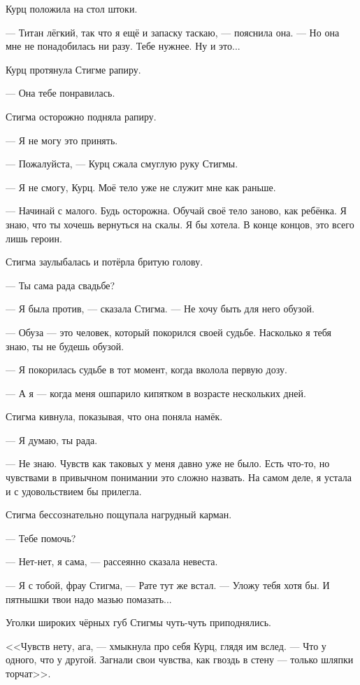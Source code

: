 Курц положила на стол штоки.

--- Титан лёгкий, так что я ещё и запаску таскаю, --- пояснила она.
--- Но она мне не понадобилась ни разу.
Тебе нужнее.
Ну и это...

Курц протянула Стигме рапиру.

--- Она тебе понравилась.

Стигма осторожно подняла рапиру.

--- Я не могу это принять.

--- Пожалуйста, --- Курц сжала смуглую руку Стигмы.

--- Я не смогу, Курц.
Моё тело уже не служит мне как раньше.

--- Начинай с малого.
Будь осторожна.
Обучай своё тело заново, как ребёнка.
Я знаю, что ты хочешь вернуться на скалы.
Я бы хотела.
В конце концов, это всего лишь героин.

Стигма заулыбалась и потёрла бритую голову.

--- Ты сама рада свадьбе?

--- Я была против, --- сказала Стигма.
--- Не хочу быть для него обузой.

--- Обуза --- это человек, который покорился своей судьбе.
Насколько я тебя знаю, ты не будешь обузой.

--- Я покорилась судьбе в тот момент, когда вколола первую дозу.

--- А я --- когда меня ошпарило кипятком в возрасте нескольких дней.

Стигма кивнула, показывая, что она поняла намёк.

--- Я думаю, ты рада.

--- Не знаю.
Чувств как таковых у меня давно уже не было.
Есть что-то, но чувствами в привычном понимании это сложно назвать.
На самом деле, я устала и с удовольствием бы прилегла.

Стигма бессознательно пощупала нагрудный карман.

--- Тебе помочь?

--- Нет-нет, я сама, --- рассеянно сказала невеста.

--- Я с тобой, фрау Стигма, --- Рате тут же встал.
--- Уложу тебя хотя бы.
И пятнышки твои надо мазью помазать...

Уголки широких чёрных губ Стигмы чуть-чуть приподнялись.

<<Чувств нету, ага, --- хмыкнула про себя Курц, глядя им вслед.
--- Что у одного, что у другой.
Загнали свои чувства, как гвоздь в стену --- только шляпки торчат>>.

